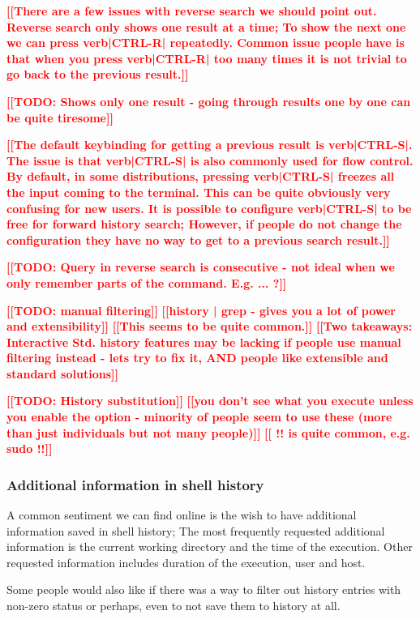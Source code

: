 \documentclass[thesis=M,english]{FITthesis}[2012/10/20]
\newcommand{\todotext}[1]{\textcolor{red}{\textbf{[[#1]]}}}
\begin{document}
\todotext{There are a few issues with reverse search we should point out. Reverse search only shows one result at a time; To show the next one we can press verb|CTRL-R| repeatedly. Common issue people have is that when you press verb|CTRL-R| too many times it is not trivial to go back to the previous result.}

\todotext{TODO: Shows only one result - going through results one by one can be quite tiresome}

\todotext{The default keybinding for getting a previous result is verb|CTRL-S|. The issue is that verb|CTRL-S| is also commonly used for flow control. By default, in some distributions, pressing verb|CTRL-S| freezes all the input coming to the terminal. This can be quite obviously very confusing for new users. It is possible to configure verb|CTRL-S| to be free for forward history search; However, if people do not change the configuration they have no way to get to a previous search result.}


\todotext{TODO: Query in reverse search is consecutive - not ideal when we only remember parts of the command. E.g. ... ?}

\todotext{TODO: manual filtering}
\todotext{history | grep - gives you a lot of power and extensibility}
\todotext{This seems to be quite common.}
\todotext{Two takeaways: Interactive Std. history features may be lacking if people use manual filtering instead - lets try to fix it, AND people like extensible and standard solutions}


\todotext{TODO: History substitution}
\todotext{you don't see what you execute unless you enable the option - minority of people seem to use these (more than just individuals but not many people)}
\todotext{ !! is quite common, e.g. sudo !!}



\subsubsection*{Additional information in shell history}

A common sentiment we can find online is the wish to have additional information saved in shell history; The most frequently requested additional information is the current working directory and the time of the execution. Other requested information includes duration of the execution, user and host. 

Some people would also like if there was a way to filter out history entries with non-zero status or perhaps, even to not save them to history at all.
\end{document}
